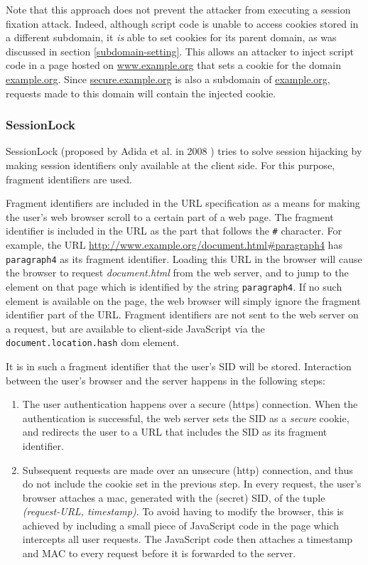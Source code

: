 Note that this approach does not prevent the attacker from executing a session fixation attack. Indeed, although script code is unable to access cookies stored in a different subdomain, it \emph{is} able to set cookies for its parent domain, as was discussed in section \ref{subdomain-setting}. This allows an attacker to inject script code in a page hosted on \url{www.example.org} that sets a cookie for the domain \url{example.org}. Since \url{secure.example.org} is also a subdomain of \url{example.org}, requests made to this domain will contain the injected cookie.

\subsubsection{SessionLock}

SessionLock (proposed by Adida et al. in 2008 \cite{Adida2008}) tries to solve session hijacking by making session identifiers only available at the client side. For this purpose, fragment identifiers are used.

Fragment identifiers are included in the URL specification \cite{rfc3986} as a means for making the user's web browser scroll to a certain part of a web page. The fragment identifier is included in the URL as the part that follows the \texttt{\#} character. For example, the URL \url{http://www.example.org/document.html#paragraph4} has \texttt{paragraph4} as its fragment identifier. Loading this URL in the browser will cause the browser to request \emph{document.html} from the web server, and to jump to the element on that page which is identified by the string \texttt{paragraph4}. If no such element is available on the page, the web browser will simply ignore the fragment identifier part of the URL. Fragment identifiers are not sent to the web server on a request, but are available to client-side JavaScript via the \texttt{document.location.hash} \gls{dom} element.

It is in such a fragment identifier that the user's SID will be stored. Interaction between the user's browser and the server happens in the following steps:
\begin{enumerate}
	\item The user authentication happens over a secure (\gls{https}) connection. When the authentication is successful, the web server sets the SID as a \emph{secure} cookie, and redirects the user to a URL that includes the SID as its fragment identifier.
	\item Subsequent requests are made over an unsecure (\gls{http}) connection, and thus do not include the cookie set in the previous step. In every request, the user's browser attaches a \gls{mac}, generated with the (secret) SID, of the tuple \emph{(request-URL, timestamp)}. To avoid having to modify the browser, this is achieved by including a small piece of JavaScript code in the page which intercepts all user requests. The JavaScript code then attaches a timestamp and MAC to every request before it is forwarded to the server.
\end{enumerate}

